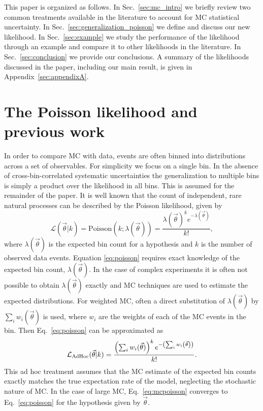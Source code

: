 \documentclass[a4paper, 11pt]{article}
\newcommand{\like}{\mathcal{L}}
\newcommand{\vectheta}{\vec{\theta}}
\newcommand{\adhoc}{\mathcal{L}_{\textmd{AdHoc}}}
\begin{document}
This paper is organized as follows. In Sec.~\ref{sec:mc_intro} we briefly review two common treatments available in the literature to account for MC statistical uncertainty. In Sec.~\ref{sec:generalization_poisson} we define and discuss our new likelihood. In Sec.~\ref{sec:example} we study the performance of the likelihood through an example and compare it to other likelihoods in the literature. In Sec.~\ref{sec:conclusion} we provide our conclusions. A summary of the likelihoods discussed in the paper, including our main result, is given in Appendix~\ref{sec:appendixA}.

\section{The Poisson likelihood and previous work\label{sec:mc_intro}}

In order to compare MC with data, events are often binned into distributions across a set of observables. For simplicity we focus on a single bin. In the absence of cross-bin-correlated systematic uncertainties the generalization to multiple bins is simply a product over the likelihood in all bins. This is assumed for the remainder of the paper. It is well known that the count of independent, rare natural processes can be described by the Poisson likelihood, given by
\begin{equation}
\label{eq:poisson}
\like(\vectheta|k) = \mathrm{Poisson}(k;\lambda(\vectheta)) = \frac{\lambda(\vectheta)^{k}e^{-\lambda(\vectheta)}}{k!},
\end{equation}
where $\lambda(\vectheta)$ is the expected bin count for a hypothesis and $k$ is the number of observed data events. Equation \eqref{eq:poisson} requires exact knowledge of the expected bin count, $\lambda(\vectheta)$. In the case of complex experiments it is often not possible to obtain $\lambda(\vectheta)$ exactly and MC techniques are used to estimate the expected distributions. For weighted MC, often a direct substitution of $\lambda(\vectheta)$ by $\sum_i{w_i(\vectheta)}$ is used, where $w_i$ are the weights of each of the MC events in the bin. Then Eq.~\eqref{eq:poisson} can be approximated as
\begin{equation} \label{eq:mcpoisson}
\adhoc(\vectheta|k) = \frac{\left(\sum_{i}{w_i(\vectheta)}\right)^{k}e^{-\left(\sum_{i}{w_i\left(\vectheta\right)}\right)}}{k!}.
\end{equation}
This ad hoc treatment assumes that the MC estimate of the expected bin counts exactly matches the true expectation rate of the model, neglecting the stochastic nature of MC. In the case of large MC, Eq.~\eqref{eq:mcpoisson} converges to Eq.~\eqref{eq:poisson} for the hypothesis given by $\vectheta$.
\end{document}
